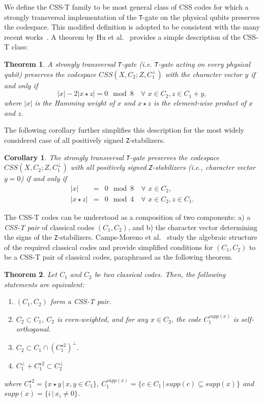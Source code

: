 \documentclass[journal]{IEEEtran}
\newcommand{\T}{\texttt{T}}
\newcommand{\Z}{\texttt{Z}}
\newtheorem{theorem}{Theorem}[section]
\newtheorem{corollary}{Corollary}[theorem]
\begin{document}
We define the CSS-T family to be most general class of CSS codes for which a strongly transversal implementation of the \T-gate on the physical qubits preserves the codespace. This modified definition is adopted to be consistent with the many recent works~\cite{camps-moreno_algebraic_2024,andrade_css-t_2023,berardini_structure_2024,berardini_asymptotically_2024,camps-moreno_toward_2024,camps-moreno_binary_2024}. A theorem by Hu et al.~\cite{hu_designing_2022} provides a simple description of the CSS-T class:
\begin{theorem}\label{thm:hu_css-t}
   A strongly transversal \T-gate (i.e. \T-gate acting on every physical qubit) preserves the codespace $CSS(X,C_2;Z,C_1^\perp)$ with the character vector $y$ if and only if
    \begin{equation}
        |x|-2|x \star z| = 0\mod{8} \quad \forall\,\,x\in C_2,z\in C_1+y,
    \end{equation}
    where $|x|$ is the Hamming weight of $x$ and $x\star z$ is the element-wise product of $x$ and $z$.
\end{theorem}
The following corollary further simplifies this description for the most widely considered case of all positively signed \Z-stabilizers.
\begin{corollary}\label{cor:hu_css-t}
    The strongly transversal \T-gate preserves the codespace $CSS(X,C_2;Z,C_1^\perp)$ with all positively signed \Z-stabilizers (i.e., character vector $y=0$) if and only if
    \begin{eqnarray}
        |x| &=& 0 \mod{8} \quad \forall\,\, x\in C_2, \\
        |x\star z| &=& 0 \mod{4} \quad \forall\,\, x\in C_2, z\in C_1.
    \end{eqnarray}
\end{corollary}
The CSS-T codes can be understood as a composition of two components: a) a \textit{CSS-T pair} of classical codes $(C_1,C_2)$, and b) the character vector determining the signs of the \Z-stabilizers. Camps-Moreno et al.~\cite{camps-moreno_algebraic_2024} study the algebraic structure of the required classical codes and provide simplified conditions for $(C_1,C_2)$ to be a CSS-T pair of classical codes, paraphrased as the following theorem.
\begin{theorem}\label{thm:css-t_conditions}
    Let $C_1$ and $C_2$ be two classical codes. Then, the following statements are equivalent:
    \begin{enumerate}
        \item $(C_1, C_2)$ form a CSS-T pair.
        \item $C_2 \subset C_1$, $C_2$ is even-weighted, and for any $x \in C_2$, the code $C_1^{supp(x)}$ is self-orthogonal.
        \item $C_2\subset C_1 \cap (C_1^{\star 2})^\perp$.
        \item $C_1^\perp + C_1^{\star 2} \subset C_2^\perp$
    \end{enumerate}
    where $C_1^{\star 2} = \{x \star y \, | \, x,y\in C_1\}$,  $C_1^{supp(x)} = \{c\in C_1 \, | \, supp(c)\subseteq supp(x) \}$ and $supp(x) = \{i \,|\, x_i \neq 0\}$.
\end{theorem}
\end{document}
